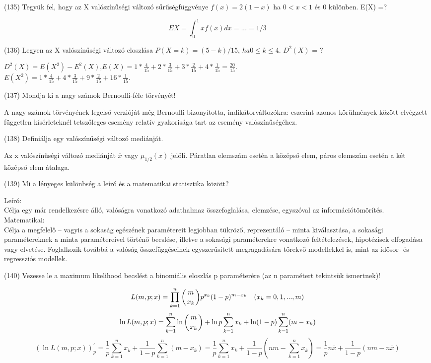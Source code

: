 \documentclass[12p]{article}
\begin{document}
(135) Tegyük fel, hogy az X valószínűségi változó sűrűségfüggvénye $f(x) = 2(1-x)$ ha $0 < x < 1$ és 0 különben. E(X) =? 

$$EX = \int^1_0 xf(x)dx = ... = 1/3$$

(136) Legyen az X valószínűségi változó eloszlása $P(X = k) = (5 - k)/15$, $ha 0 \leq k \leq 4$. $D^2(X)$ = ?

$D^2(X) = E(X^2) - E^2(X)$,$E(X) = 1 * \frac{4}{15} + 2 * \frac{3}{15} + 3 * \frac{2}{15} + 4 * \frac{1}{15} = \frac{20}{15}$.\\
$E(X^2) = 1 * \frac{4}{15} + 4 * \frac{3}{15} + 9 * \frac{2}{15} + 16 * \frac{1}{15}$.

(137) Mondja ki a nagy számok Bernoulli-féle törvényét!

A nagy számok törvényének legelső verzióját
még Bernoulli bizonyította,
indikátorváltozókra: eszerint azonos
körülmények között elvégzett független
kísérleteknél tetszőleges esemény relatív
gyakorisága tart az esemény
valószínűségéhez.

(138) Definiálja egy valószínűségi változó mediánját.

Az x valószínűségi változó mediánját $\overline{x}$ vagy $\mu_{1/2}(x)$ jelöli.
Páratlan elemszám esetén a középső elem, páros elemszám esetén a két középső elem átalaga.

(139) Mi a lényeges különbség a leíró és a matematikai statisztika között?

Leíró:\\
Célja egy már rendelkezésre álló, valóságra vonatkozó adathalmaz összefoglalása, elemzése, egyszóval az információtömörítés.\\
Matematikai:\\
Célja a megfelelő – vagyis a sokaság egészének paramétereit legjobban tükröző, reprezentáló – minta kiválasztása, a sokasági paramétereknek a minta paramétereivel történő becslése, illetve a sokasági paraméterekre vonatkozó feltételezések, hipotézisek elfogadása vagy elvetése. Foglalkozik továbbá a valóság összefüggéseinek egyszerűsített megragadására törekvő modellekkel is, mint az idősor- és regressziós modellek.

(140) Vezesse le a maximum likelihood becslést a binomiális eloszlás p paraméterére (az n paramétert tekintsük ismertnek)!

$$L(m, p; x) = \prod_{k=1}^n \displaystyle{\left({m \atop x_k}\right)}p^{x_k}(1-p)^{m-x_k} \quad (x_k = 0, 1, ..., m)$$
$$\ln L(m, p; x) = \sum^n_{k=1} \ln \left ({m \atop x_k}\right) + \ln p \sum^n_{k=1} x_k + \ln(1-p) \sum^n_{k=1}(m-x_k)$$
$$(\ln L(m,p;x))^{'}_p = \frac{1}{p} \sum^n_{k=1}x_k + \frac{1}{1-p} \sum^n_{k=1} (m - x_k) = \frac{1}{p} \sum^n_{k=1}x_k + \frac{1}{1-p}
\left(nm- \sum^n_{k=1}x_k \right) = \frac{1}{p}n\overline{x} + \frac{1}{1-p}(nm-n\overline{x})$$
\end{document}
